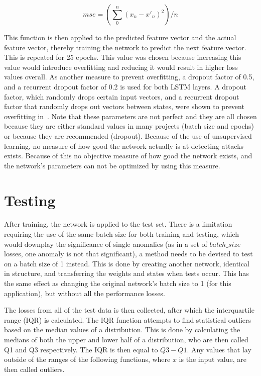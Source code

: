 $$ mse = (\sum\limits_{0}^{n} {(x_n - x'_n)}^2) / n $$

This function is then applied to the predicted feature vector and the actual feature vector, thereby training the network to predict the next feature vector. This is repeated for 25 epochs. This value was chosen because increasing this value would introduce overfitting and reducing it would result in higher loss values overall. As another measure to prevent overfitting, a dropout factor of 0.5, and a recurrent dropout factor of 0.2 is used for both LSTM layers. A dropout factor, which randomly drops certain input vectors, and a recurrent dropout factor that randomly drops out vectors between states, were shown to prevent overfitting in~\cite{srivastava2014dropout}. Note that these parameters are not perfect and they are all chosen because they are either standard values in many projects (batch size and epochs) or because they are recommended (dropout). Because of the use of unsupervised learning, no measure of how good the network actually is at detecting attacks exists. Because of this no objective measure of how good the network exists, and the network's parameters can not be optimized by using this measure.

\section{Testing}\label{sec:methods:testing}
After training, the network is applied to the test set. There is a limitation requiring the use of the same batch size for both training and testing, which would downplay the significance of single anomalies (as in a set of \(batch\_size\) losses, one anomaly is not that significant), a method needs to be devised to test on a batch size of 1 instead. This is done by creating another network, identical in structure, and transferring the weights and states when tests occur. This has the same effect as changing the original network's batch size to 1 (for this application), but without all the performance losses.

The losses from all of the test data is then collected, after which the interquartile range (IQR) is calculated. The IQR function attempts to find statistical outliers based on the median values of a distribution. This is done by calculating the medians of both the upper and lower half of a distribution, who are then called Q1 and Q3 respectively. The IQR is then equal to \(Q3 - Q1\). Any values that lay outside of the ranges of the following functions, where \(x\) is the input value, are then called outliers.

